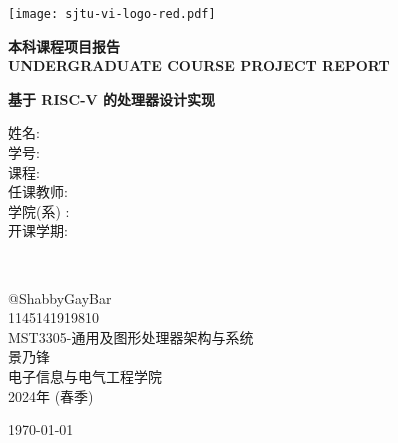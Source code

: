 
\begin{titlepage}
	\begin{center}
		\texttt{[image: sjtu-vi-logo-red.pdf]}
		\vspace*{1cm}

		\Huge
		\textbf{本科课程项目报告} \\
		\LARGE
		\textbf{UNDERGRADUATE COURSE PROJECT REPORT}

		\vspace{2cm}
		\huge
		\textbf{基于 RISC-V 的处理器设计实现} \\

		\vfill

		\Large
		\begin{minipage}{0.2\textwidth}
			\begin{flushleft}
				\LARGE
				姓\qquad 名: \\
				学\qquad 号: \\
				课\qquad 程: \\
				任课教师: \\
				学院(系) : \\
				开课学期: 
			\end{flushleft}
		\end{minipage}
		~
		\begin{minipage}{0.7\textwidth}
			\begin{center}
				\LARGE
				@ShabbyGayBar \\
				1145141919810 \\
				MST3305-通用及图形处理器架构与系统 \\
				景乃锋 \\
				电子信息与电气工程学院 \\
				2024年 (春季)
			\end{center}
		\end{minipage}
		
		\vspace{1cm}
		\LARGE
		\today
	\end{center}
\end{titlepage}
